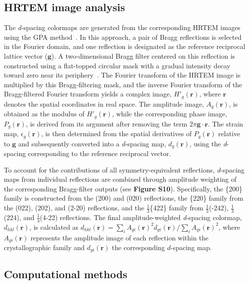 \documentclass[reprint,amsmath,amssymb,aip,nofootinbib, citeautoscript,]{revtex4-2}
\begin{document}
\subsection*{HRTEM image analysis}

The \textit{d}-spacing colormaps are generated from the corresponding HRTEM images using the GPA method~\cite{hytch_analysis_1997,hytch_quantitative_1998}. In this approach, a pair of Bragg reflections is selected in the Fourier domain, and one reflection is designated as the reference reciprocal lattice vector ($\mathbf{g}$). A two-dimensional Bragg filter centered on this reflection is constructed using a flat-topped circular mask with a gradual intensity decay toward zero near its periphery~\cite{lee_atomic_2024}. The Fourier transform of the HRTEM image is multiplied by this Bragg-filtering mask, and the inverse Fourier transform of the Bragg-filtered Fourier transform yields a complex image, $H'_g(\mathbf{r})$, where $\mathbf{r}$ denotes the spatial coordinates in real space. The amplitude image, $A_g(\mathbf{r})$, is obtained as the modulus of $H'_g(\mathbf{r})$, while the corresponding phase image, $P_g(\mathbf{r})$, is derived from its argument after removing the term $2\pi\mathbf{g}\cdot\mathbf{r}$. The strain map, $\epsilon_g(\mathbf{r})$, is then determined from the spatial derivatives of $P_g(\mathbf{r})$ relative to $\mathbf{g}$ and subsequently converted into a \textit{d}-spacing map, $d_g(\mathbf{r})$, using the \textit{d}-spacing corresponding to the reference reciprocal vector.


To account for the contributions of all symmetry-equivalent reflections, \textit{d}-spacing maps from individual reflections are combined through amplitude weighting of the corresponding Bragg-filter outputs (see \textbf{Figure S10}). Specifically, the \{200\} family is constructed from the (200) and (020) reflections, the \{220\} family from the (022), (202), and (2-20) reflections, and the $\frac{1}{3}$\{422\} family from $\frac{1}{3}$(-242), $\frac{1}{3}$(224), and $\frac{1}{3}$(4-22) reflections. The final amplitude-weighted \textit{d}-spacing colormap, $d_{hkl}(\mathbf{r})$, is calculated as $d_{hkl}(\mathbf{r}) = \sum_i A_{gi}(\mathbf{r})^2 d_{gi}(\mathbf{r}) / \sum_i A_{gi}(\mathbf{r})^2$, where $A_{gi}(\mathbf{r})$ represents the amplitude image of each reflection within the crystallographic family and $d_{gi}(\mathbf{r})$ the corresponding $d$-spacing map.


\subsection*{Computational methods}
\end{document}
